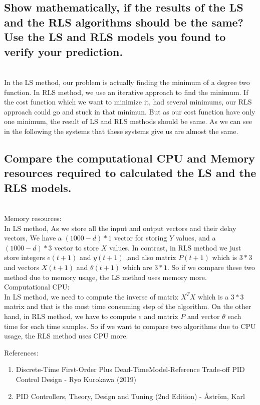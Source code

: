 \documentclass[11pt]{scrartcl} %
\begin{document}
\subsection{Show mathematically, if the results of the LS and the RLS algorithms should be the same? Use the
LS and RLS models you found to verify your prediction.}
\\

In the LS method, our problem is actually finding the minimum of a degree two function. In RLS method, we use an iterative approach to find the minimum. If the cost function which we want to minimize it, had several minimums, our RLS approach could go and stuck in that minimun. But as our cost function have only one minimum, the result of LS and RLS methods should be same. As we can see in the following the systems that these systems give us are almost the same.

\subsection{Compare the computational CPU and Memory resources required to calculated the LS and the RLS
models.}

\\

Memory resources:\\ 

In LS method, As we store all the input and output vectors and their delay vectors, We have a $(1000-d)*1$ vector for storing $Y$ values, and a $(1000-d)*3$ vector to store $X$ values. In contrast, in RLS method we just store integers $e(t+1)$ and $y(t+1)$ ,and also matrix $P(t+1)$ which is $3*3$ and vectors $X(t+1)$ and $\theta(t+1)$ which are $3*1$. So if we compare these two method due to memory usage, the LS method uses memory more.\\



Computational CPU:\\

In LS method, we need to compute the inverse of matrix $X^TX$ which is a $3*3$ matrix and that is the most time consuming step of the algorithm. On the other hand, in RLS method, we have to compute $e$ and matrix $P$ and vector $\theta$ each time for each time samples. So if we want to compare two algorithms due to CPU usage, the RLS method uses CPU more.



\newpage
{\huge References:}
\begin{enumerate}
	\item Discrete-Time First-Order Plus Dead-TimeModel-Reference Trade-off PID Control Design - Ryo Kurokawa (2019)
	\item PID Controllers, Theory, Design and Tuning (2nd Edition) - Åström, Karl
\end{enumerate}
\end{document}
